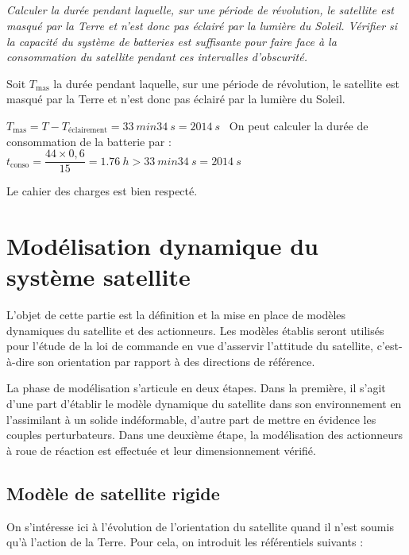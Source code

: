 \else
\fi

\subparagraph{\label{q_5}}\textit{Calculer la durée pendant laquelle, sur une période de révolution, le
  satellite est masqué par la Terre et n'est donc pas éclairé par la
  lumière du Soleil. Vérifier si la capacité du système de batteries est
  suffisante pour faire face à la consommation du satellite pendant ces
  intervalles d'obscurité.}
\ifprof
\begin{corrige}
Soit $T_{\text{mas}}$  la durée pendant laquelle, sur une période de révolution, le
  satellite est masqué par la Terre et n'est donc pas éclairé par la
  lumière du Soleil.
  
  $  T_{\text{mas}}=T-T_{\text{éclairement}}=\SI{33}{min}\SI{34}{s}=\SI{2014}{s}$
  \
  On peut calculer la durée de consommation de la batterie par  : 
  $  t_{\text{conso}}=\dfrac{44\times 0,6}{15}=\SI{1,76}{h}>\SI{33}{min}\SI{34}{s}=\SI{2014}{s}$
  
  Le cahier des charges est bien respecté.
\end{corrige}
\else
\fi


\section{Modélisation dynamique du système satellite}\label{partieII}

\begin{obj}
L'objet de cette partie est la définition et la mise en place de modèles
dynamiques du satellite et des actionneurs. Les modèles établis seront
utilisés pour l'étude de la loi de commande en vue d'asservir l'attitude
du satellite, c'est-à-dire son orientation par rapport à des directions
de référence.
\end{obj}

\ifprof
\else
La phase de modélisation s'articule en deux étapes. Dans la première, il
s'agit d'une part d'établir le modèle dynamique du satellite dans son
environnement en l'assimilant à un solide indéformable, d'autre part de
mettre en évidence les couples perturbateurs. Dans une deuxième étape,
la modélisation des actionneurs à roue de réaction est effectuée et leur
dimensionnement vérifié.
\fi

\subsection{Modèle de satellite rigide}
\ifprof
\else
On s'intéresse ici à l'évolution de l'orientation du satellite quand il
n'est soumis qu'à l'action de la Terre. Pour cela, on introduit les
référentiels suivants :

